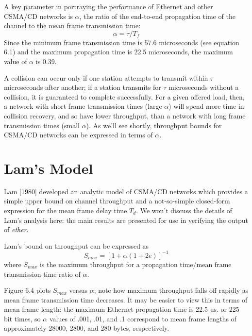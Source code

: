 A key parameter in portraying the performance of Ethernet and other CSMA/CD networks is $\alpha$, the ratio of the end-to-end propagation time of the channel to the mean frame transmission time:
\begin{equation} \alpha=\tau/T_f \end{equation}
Since the minimum frame transmission time is 57.6 microseconds (see equation 6.1) and the maximum propagation time is 22.5 microseconds, the maximum value of $\alpha$ is 0.39.


A collision can occur only if one station attempts to transmit within $\tau$ microseconds after another; if a station transmits for $\tau$ microseconds without a collision, it is guaranteed to complete successfully. For a given offered load, then, a network with short frame transmission times (large $\alpha$) will spend more time in collision recovery, and so have lower throughput, than a network with long frame transmission times (small $\alpha$). As we'll see shortly, throughput bounds for CSMA/CD networks can be expressed in terms of $\alpha$.

\section{Lam's Model}

Lam [1980] developed an analytic model of CSMA/CD networks which provides a simple upper bound on channel throughput and a not-so-simple closed-form expression for the mean frame delay time $T_d$. We won't discuss the details of Lam's analysis here: the main results are presented for use in verifying the output of \emph{ether}.

Lam's bound on throughput can be expressed as
\begin{equation} S_{max}=[1+\alpha(1+2e)]^{-1} \end{equation}
where $S_{max}$ is the maximum throughput for a propagation time/mean frame transmission time ratio of $\alpha$.

Figure 6.4 plots $S_{max}$ versus $\alpha$; note how maximum throughput falls off rapidly as mean frame transmission time decreases. It may be easier to view this in terms of mean frame length: the maximum Ethernet propagation time is 22.5 us. or 225 bit times, so $\alpha$ values of .001, .01, and .1 correspond to mean frame lengths of approximately 28000, 2800, and 280 bytes, respectively.



